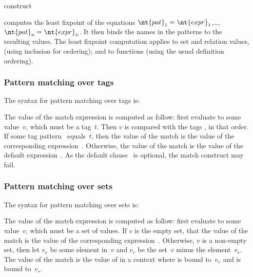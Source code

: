  construct
\begin{center}
  
\end{center}
computes the least fixpoint of the equations
$\nt{pat}_1 = \nt{expr}_1$,\ldots, $\nt{pat}_n = \nt{expr}_n$.
It then binds the names in the patterns
 to the
resulting values.
The least fixpoint computation applies to set and relation values,
(using inclusion for ordering); and to
functions (using the usual definition ordering).


\subsubsection*{Pattern matching over tags}
The syntax for pattern matching over tags is:
\begin{center}
\end{center}
The value of the match expression is computed as follow: first evaluate
 to some value~$v$, which must be a tag~$t$.
Then $v$ is compared with the tags ,
in that order.
If some tag pattern~ equals~$t$, then the value of the
match is the value of the corresponding expression~.
Otherwise, the value of the match is the value of the default
expression~.
As the default clause~ is optional,
the match construct may fail.

\subsubsection*{Pattern matching over sets}
The syntax for pattern matching over sets is:
\begin{center}
\end{center}
The value of the match expression is computed as follow: first evaluate
 to some value~$v$, which must be a set of values.
If $v$ is the empty set, that the value of the match is the
value of the corresponding expression~.
Otherwise, $v$ is a non-empty set, then let $v_e$ be some element in~$v$
and $v_r$ be the set~$v$ minus the element~$v_e$.
The value of the match is the value of  in a context
where  is bound to~$v_e$ and  is bound
to~$v_r$.

